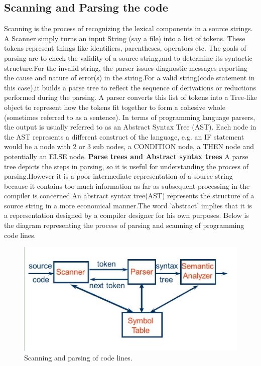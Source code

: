 \documentclass[a4paper,12pt]{extarticle}
\begin{document}
\subsection{Scanning and Parsing the code}
Scanning is the process of recognizing the lexical components in a source strings. A
Scanner simply turns an input String (say a file) into a list of tokens. These tokens
represent things like identifiers, parentheses, operators etc.\newline
The goals of parsing are to check the validity of a source string,and to determine
its syntactic structure.For the invalid string, the parser issues diagnostic messages
reporting the cause and nature of error(s) in the string.For a valid string(code statement
in this case),it builds a parse tree to reflect the sequence of derivations or
reductions performed during the parsing. A parser converts this list of tokens into
a Tree-like object to represent how the tokens fit together to form a cohesive whole
(sometimes referred to as a sentence).\newline
In terms of programming language parsers, the output is usually referred to as an
Abstract Syntax Tree (AST). Each node in the AST represents a different construct
of the language, e.g. an IF statement would be a node with 2 or 3 sub nodes, a
CONDITION node, a THEN node and potentially an ELSE node.\newline
\textbf{Parse trees and Abstract syntax trees}\newline
A parse tree depicts the steps in parsing, so it is useful for understanding the process
of parsing.However it is a poor intermediate representation of a source string
because it contains too much information as far as subsequent processing in the
compiler is concerned.An abstract syntax tree(AST) represents the structure of a
source string in a more economical manner.The word ’abstract’ implies that it is
a representation designed by a compiler designer for his own purposes. Below is
the diagram representing the process of parsing and scanning of programming code
lines.\newline
\begin{figure}[h!]
	\includegraphics[width=\linewidth]{scanparse.png}
	\caption{Scanning and parsing of code lines.}
	\label{fig:scanparse}
\end{figure}
\end{document}
